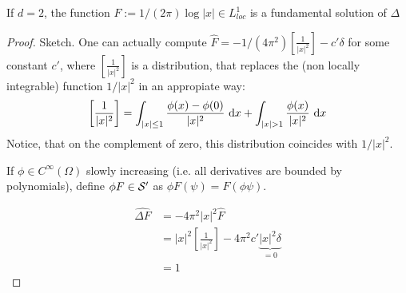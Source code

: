 	\begin{proposition}
		If $d = 2$, the function $F := 1/(2\pi) \log |x| \in L^1_{loc}$ is a fundamental solution of $\Delta$    
	\end{proposition}
	\begin{proof} Sketch.
		One can actually compute $\hat F = -1 / (4\pi^2) \left [\frac{1}{|x|^2} \right] - c' \delta$ for some constant $c'$, where  $\left [\frac{1}{|x|^2} \right]$ is a distribution, that replaces the (non locally integrable) function $1  / |x|^2$ in an appropiate way:
		\[
		\left [\frac{1}{|x|^2} \right] = \int_{|x| \le 1} \frac{\phi(x) - \phi(0)}{|x|^2} \ \mathrm{d} x + \int_{|x| > 1} \frac{\phi(x)}{|x|^2} \ \mathrm{d} x 
		\]
		Notice, that on the complement of zero, this distribution coincides with $1 / |x|^2$.
		\begin{notation}
			If $\phi \in C^\infty(\Omega)$ slowly increasing (i.e. all derivatives are bounded by polynomials), define $\phi F \in \mathcal{S}'$ as $\phi F(\psi) = F(\phi \psi)$.
		\end{notation}
		\begin{align*}
			\widehat{ \Delta F} &= -4 \pi^2 |x|^2 \hat F\\
			&=  |x|^2 \left [\frac{1}{|x|^2} \right] - 4\pi^2 c' \underbrace{|x|^2 \delta}_{=0} \\
			&= 1
		\end{align*}
	\end{proof}
